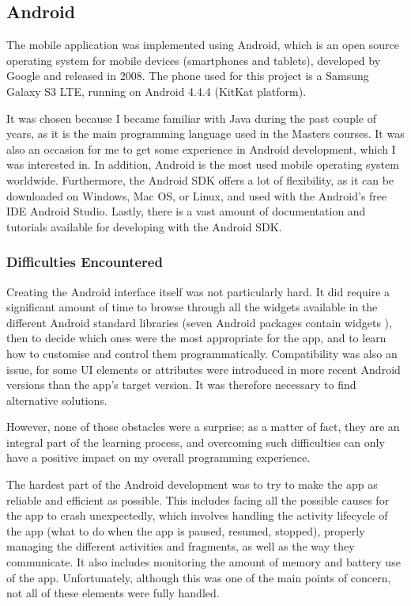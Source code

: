 \documentclass{mproj}
\begin{document}
\subsection{Android}

The mobile application was implemented using Android, which is an open source operating system for mobile devices (smartphones and tablets), developed by Google and released in 2008.\cite{androidrelease} The phone used for this project is a Samsung Galaxy S3 LTE, running on Android 4.4.4 (KitKat platform).

It was chosen because I became familiar with Java during the past couple of years, as it is the main programming language used in the Masters courses. It was also an occasion for me to get some experience in Android development, which I was interested in. In addition, Android is the most used mobile operating system worldwide. \cite{androidsales} Furthermore, the Android SDK offers a lot of flexibility, as it can be downloaded on Windows, Mac OS, or Linux, and used with the Android's free IDE Android Studio. \cite{androidstudio} Lastly, there is a vast amount of documentation and tutorials available for developing with the Android SDK. \cite{androidtutorials} \cite{thebignerdranchguide}

\subsubsection*{Difficulties Encountered}

Creating the Android interface itself was not particularly hard. It did require a significant amount of time to browse through all the widgets available in the different Android standard libraries (seven Android packages contain widgets \cite{androidpackages}), then to decide which ones were the most appropriate for the app, and to learn how to customise and control them programmatically. Compatibility was also an issue, for some UI elements or attributes were introduced in more recent Android versions than the app's target version. It was therefore necessary to find alternative solutions. \par

However, none of those obstacles were a surprise; as a matter of fact, they are an integral part of the learning process, and overcoming such difficulties can only have a positive impact on my overall programming experience. \par

The hardest part of the Android development was to try to make the app as reliable and efficient as possible. This includes facing all the possible causes for the app to crash unexpectedly, which involves handling the activity lifecycle of the app \cite{androidlifecycle} (what to do when the app is paused, resumed, stopped), properly managing the different activities and fragments, as well as the way they communicate. It also includes monitoring the amount of memory and battery use of the app.
Unfortunately, although this was one of the main points of concern, not all of these elements were fully handled. \par
\end{document}
